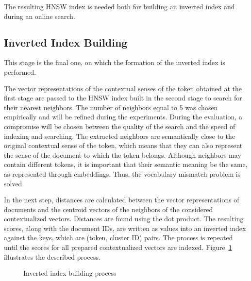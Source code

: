 \documentclass[
    twocolumn,
]{template/ceurart}
\begin{document}
    The resulting HNSW index is needed both for building an inverted index and during an online search.

    \subsection{Inverted Index Building}
    This stage is the final one, on which the formation of the inverted index is performed.

    The vector representations of the contextual senses of the token obtained at the first stage
    are passed to the HNSW index built in the second stage to search for their nearest neighbors.
    The number of neighbors equal to 5 was chosen empirically and will be refined during the experiments.
    During the evaluation, a compromise will be chosen between the quality of the search and
    the speed of indexing and searching.
    The extracted neighbors are semantically close to the original contextual sense of the token,
    which means that they can also represent the sense of the document to which the token belongs.
    Although neighbors may contain different tokens, it is important that their semantic meaning be the same,
    as represented through embeddings.
    Thus, the vocabulary mismatch problem is solved.

    In the next step, distances are calculated between the vector representations of documents and
    the centroid vectors of the neighbors of the considered contextualized vectors.
    Distances are found using the dot product.
    The resulting scores, along with the document IDs, are written as values into an inverted index against the keys,
    which are (token, cluster ID) pairs.
    The process is repeated until the scores for all prepared contextualized vectors are indexed.
    Figure~\ref{fig:invertedIndexBuilding} illustrates the described process.
    \begin{figure}
        \centering
        
        \caption{Inverted index building process}
        \label{fig:invertedIndexBuilding}
    \end{figure}
\end{document}
